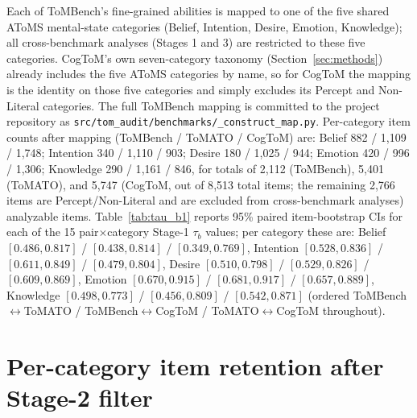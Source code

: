 \documentclass{article} %
\begin{document}
Each of ToMBench's fine-grained abilities is mapped to one of the five shared AToMS \citep{beaudoin2020atoms} mental-state categories (Belief, Intention, Desire, Emotion, Knowledge); all cross-benchmark analyses (Stages 1 and 3) are restricted to these five categories. CogToM's own seven-category taxonomy (Section~\ref{sec:methods}) already includes the five AToMS categories by name, so for CogToM the mapping is the identity on those five categories and simply excludes its Percept and Non-Literal categories. The full ToMBench mapping is committed to the project repository as \texttt{src/tom\_audit/benchmarks/\_construct\_map.py}. Per-category item counts after mapping (ToMBench / ToMATO / CogToM) are: Belief 882 / 1{,}109 / 1{,}748; Intention 340 / 1{,}110 / 903; Desire 180 / 1{,}025 / 944; Emotion 420 / 996 / 1{,}306; Knowledge 290 / 1{,}161 / 846, for totals of 2{,}112 (ToMBench), 5{,}401 (ToMATO), and 5{,}747 (CogToM, out of 8{,}513 total items; the remaining 2{,}766 items are Percept/Non-Literal and are excluded from cross-benchmark analyses) analyzable items. Table~\ref{tab:tau_b1} reports 95\% paired item-bootstrap CIs for each of the 15 pair$\times$category Stage-1 $\tau_b$ values; per category these are: Belief $[0.486,0.817]$ / $[0.438,0.814]$ / $[0.349,0.769]$, Intention $[0.528,0.836]$ / $[0.611,0.849]$ / $[0.479,0.804]$, Desire $[0.510,0.798]$ / $[0.529,0.826]$ / $[0.609,0.869]$, Emotion $[0.670,0.915]$ / $[0.681,0.917]$ / $[0.657,0.889]$, Knowledge $[0.498,0.773]$ / $[0.456,0.809]$ / $[0.542,0.871]$ (ordered ToMBench$\leftrightarrow$ToMATO / ToMBench$\leftrightarrow$CogToM / ToMATO$\leftrightarrow$CogToM throughout).
 
\section{Per-category item retention after Stage-2 filter}
\label{app:retention}
 
\end{document}
